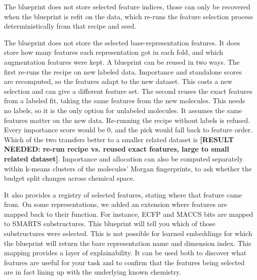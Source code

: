 The blueprint does not store selected feature indices, those can only be recovered when the blueprint is refit on the data, which re-runs the feature selection process deterministically from that recipe and seed.

The blueprint does not store the selected base-representation features. It does store how many features each representation got in each fold, and which augmentation features were kept. A blueprint can be reused in two ways. The first re-runs the recipe on new labeled data. Importance and standalone scores are recomputed, so the features adapt to the new dataset. This costs a new selection and can give a different feature set. The second reuses the exact features from a labeled fit, taking the same features from the new molecules. This needs no labels, so it is the only option for unlabeled molecules. It assumes the same features matter on the new data. Re-running the recipe without labels is refused. Every importance score would be 0, and the pick would fall back to feature order. Which of the two transfers better to a smaller related dataset is \textbf{[RESULT NEEDED: re-run recipe vs. reused exact features, large to small related dataset]}. Importance and allocation can also be computed separately within k-means clusters of the molecules' Morgan fingerprints, to ask whether the budget split changes across chemical space.

It also provides a registry of selected features, stating where that feature came from. On some representations, we added an extension where features are mapped back to their function. For instance, ECFP and MACCS bits are mapped to SMARTS substructures. This blueprint will tell you which of those substructures were selected. This is not possible for learned embeddings for which the blueprint will return the bare representation name and dimension index. This mapping provides a layer of explainability. It can be used both to discover what features are useful for your task and to confirm that the features being selected are in fact lining up with the underlying known chemistry.


